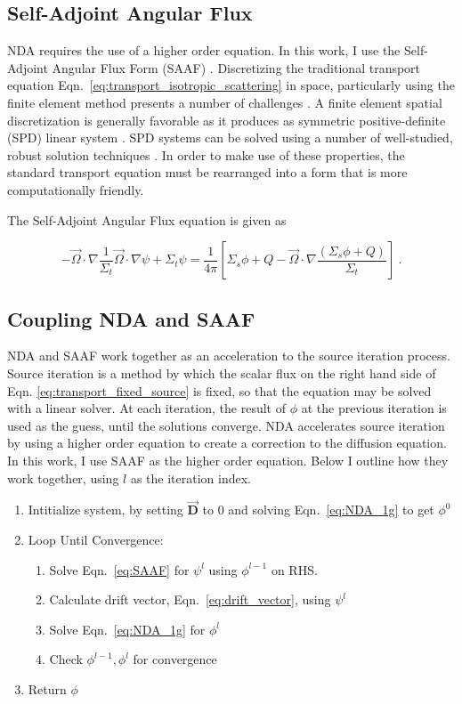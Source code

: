 \subsection{Self-Adjoint Angular Flux}
NDA requires the use of a higher order equation. In this work, I use the Self-Adjoint Angular Flux Form (SAAF) \cite{saaf}. Discretizing the traditional transport equation Eqn.~\eqref{eq:transport_isotropic_scattering} in space, particularly using the finite element method presents a number of challenges \cite{saaf}. A finite element spatial discretization is generally favorable as it produces as symmetric positive-definite (SPD) linear system \cite{zheng-siam}. SPD systems can be solved using a number of well-studied, robust solution techniques \cite{Shewchuck1994}. In order to make use of these properties,  the standard transport equation must be rearranged into a form that is more computationally friendly.

The Self-Adjoint Angular Flux equation is given as

\begin{equation}
    - \vec{\Omega} \cdot \nabla \frac{1}{\Sigma_t}\vec{\Omega} \cdot \nabla \psi + \Sigma_t \psi = \frac{1}{4\pi}[\Sigma_s\phi + Q - \vec{\Omega} \cdot \nabla \frac{(\Sigma_s\phi + Q)}{\Sigma_t}]\:.
    \label{eq:SAAF}
\end{equation}


\subsection{Coupling NDA and SAAF}
NDA and SAAF work together as an acceleration to the source iteration process. Source iteration is a method by which the scalar flux on the right hand side of Eqn. \eqref{eq:transport_fixed_source} is fixed, so that the equation may be solved with a linear solver. At each iteration, the result of $\phi$ at the previous iteration is used as the guess, until the solutions converge. NDA accelerates source iteration by using a higher order equation to create a correction to the diffusion equation. In this work, I use SAAF as the higher order equation. Below I outline how they work together, using $l$ as the iteration index.

\begin{enumerate}
    \item Intitialize system, by setting $\vec{\textbf{D}}$ to 0 and solving Eqn.~\eqref{eq:NDA_1g} to get $\phi^0$ 
    \item Loop Until Convergence:
        \begin{enumerate}
            \item Solve Eqn.~\eqref{eq:SAAF} for $\psi^l$ using $\phi^{l-1}$ on RHS.
            \item Calculate drift vector, Eqn.~\eqref{eq:drift_vector}, using $\psi^l$
            \item Solve Eqn.~\eqref{eq:NDA_1g} for $\phi^l$
            \item Check $\phi^{l-1}, \phi^l$ for convergence
        \end{enumerate}
    \item Return $\phi$
\end{enumerate}

